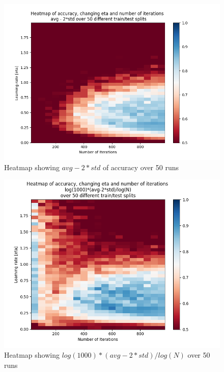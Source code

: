 \documentclass{article}
\begin{document}
\begin{figure}[h]
    \centering
    \includegraphics[width=\textwidth]{05_backprop/indep50avgstd.png}
    \caption{Heatmap showing \(avg - 2*std\) of accuracy over 50 runs}
    \label{fig:indep50avgstd}
\end{figure}
\begin{figure}[h]
    \centering
    \includegraphics[width=\textwidth]{05_backprop/indep50log.png}
    \caption{Heatmap showing \(log(1000)*(avg-2*std)/log(N)\) over 50 runs}
    \label{fig:indep50log}
\end{figure}
\\
\end{document}
